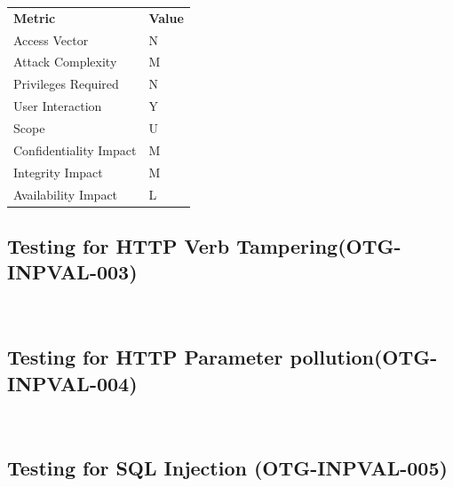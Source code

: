 \documentclass[headsepline,footsepline,footinclude=false,oneside,fontsize=11pt,paper=a4,listof=totoc,bibliography=totoc]{scrbook} %
\begin{document}
\vspace{0.5cm} 
\begin{center}
	\begin{tabular}{ll}
		\rowcolor[HTML]{34CDF9} 
		{\color[HTML]{ECF4FF} \textbf{Metric}}        & {\color[HTML]{ECF4FF} \textbf{Value}} \\
		\rowcolor[HTML]{BBDAFF} 
		{\color[HTML]{333333} Access Vector}          & {\color[HTML]{333333} N}               \\
		\rowcolor[HTML]{ECF4FF} 
		{\color[HTML]{333333} Attack Complexity}      & {\color[HTML]{333333} M}               \\
		\rowcolor[HTML]{BBDAFF} 
		{\color[HTML]{333333} Privileges Required}    & {\color[HTML]{333333} N}               \\
		\rowcolor[HTML]{ECF4FF} 
		{\color[HTML]{333333} User Interaction}       & {\color[HTML]{333333} Y}               \\
		\rowcolor[HTML]{BBDAFF} 
		{\color[HTML]{333333} Scope}                  & {\color[HTML]{333333} U}               \\
		\rowcolor[HTML]{ECF4FF} 
		{\color[HTML]{333333} Confidentiality Impact} & {\color[HTML]{333333} M}               \\
		\rowcolor[HTML]{BBDAFF} 
		{\color[HTML]{333333} Integrity Impact}       & {\color[HTML]{333333} M}               \\
		\rowcolor[HTML]{ECF4FF} 
		{\color[HTML]{333333} Availability Impact}    & {\color[HTML]{333333} L}              
	\end{tabular}
\end{center}
\pagebreak 
\subsection{Testing for HTTP Verb Tampering(OTG-INPVAL-003)}\

\pagebreak 
\subsection{Testing for HTTP Parameter pollution(OTG-INPVAL-004)}\
\pagebreak 
\subsection{Testing for SQL Injection  (OTG-INPVAL-005)}\
\end{document}
